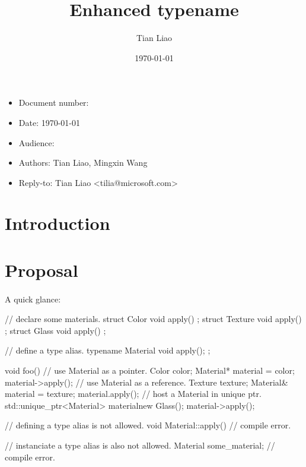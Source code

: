 \documentclass{article}
\title{Enhanced typename}
\author{Tian Liao}
\date{\today}
\begin{document}
\maketitle
\vfill
\begin{itemize}[noitemsep]
  \item[] Document number:
  \item[] Date: \today
  \item[] Audience:
  \item[] Authors: Tian Liao, Mingxin Wang
  \item[] Reply-to: Tian Liao \textless tilia@microsoft.com\textgreater
\end{itemize}

\newpage
{}

\section{Introduction}

\section{Proposal}

\paragraph{}
A quick glance:
\begin{codeblock}
// declare some materials.
struct Color { void apply() {} };
struct Texture { void apply() {} };
struct Glass { void apply() {} };

// define a type alias.
typename Material { void apply(); };

void foo() {
  {
    // use Material as a pointer.
    Color color;
    Material* material = color;
    material->apply();
  }
  {
    // use Material as a reference.
    Texture texture;
    Material& material = texture;
    material.apply();
  }
  {
    // host a Material in unique ptr.
    std::unique_ptr<Material> material{new Glass()};
    material->apply();
  }
}

// defining a type alias is not allowed.
void Material::apply() {} // compile error.

// instanciate a type alias is also not allowed.
Material some_material; // compile error.

\end{codeblock}
\end{document}
